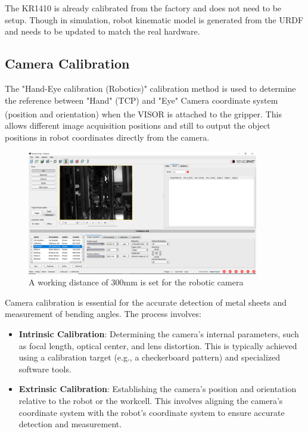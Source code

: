 The KR1410 is already calibrated from the factory and does not need to be setup. Though in simulation, robot kinematic model is generated from the URDF and needs to be updated to match the real hardware.

\subsection{Camera Calibration}
The "Hand-Eye calibration (Robotics)" calibration method is used to determine the
reference between "Hand" (TCP) and "Eye" Camera coordinate system
(position and orientation) when the VISOR\textsuperscript{\textregistered} is attached to the gripper.
This allows different image acquisition positions and still to output the object positions
in robot coordinates directly from the camera.
\cite[page 102]{visor_user_manual}

\begin{figure}[h]
    \centering
    \includegraphics[width=0.9\textwidth]{6. System Integration and Testing/6.2 Calibration Procedures/shutter_speed.PNG}
    \caption{A working distance of 300mm is set for the robotic camera}
    \label{fig:working-distance}
\end{figure}

Camera calibration is essential for the accurate detection of metal sheets and measurement of bending angles. The process involves:

\begin{itemize}
    \item \textbf{Intrinsic Calibration}: Determining the camera's internal parameters, such as focal length, optical center, and lens distortion. This is typically achieved using a calibration target (e.g., a checkerboard pattern) and specialized software tools.
    \item \textbf{Extrinsic Calibration}: Establishing the camera's position and orientation relative to the robot or the workcell. This involves aligning the camera's coordinate system with the robot’s coordinate system to ensure accurate detection and measurement.
\end{itemize}


